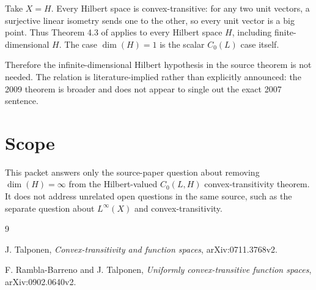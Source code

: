 \documentclass[11pt]{article}
\begin{document}
Take \(X=H\).  Every Hilbert space is convex-transitive: for any two unit
vectors, a surjective linear isometry sends one to the other, so every unit
vector is a big point.  Thus Theorem 4.3 of \cite{RT2009} applies to every
Hilbert space \(H\), including finite-dimensional \(H\).  The case
\(\dim(H)=1\) is the scalar \(C_0(L)\) case itself.

Therefore the infinite-dimensional Hilbert hypothesis in the source theorem is
not needed.  The relation is literature-implied rather than explicitly
announced: the 2009 theorem is broader and does not appear to single out the
exact 2007 sentence.

\section*{Scope}

This packet answers only the source-paper question about removing
\(\dim(H)=\infty\) from the Hilbert-valued \(C_0(L,H)\) convex-transitivity
theorem.  It does not address unrelated open questions in the same source,
such as the separate question about \(L^\infty(X)\) and convex-transitivity.

\begin{thebibliography}{9}
\raggedright
{}
J. Talponen,
\emph{Convex-transitivity and function spaces},
arXiv:0711.3768v2.

F. Rambla-Barreno and J. Talponen,
\emph{Uniformly convex-transitive function spaces},
arXiv:0902.0640v2.
\end{thebibliography}
\end{document}
